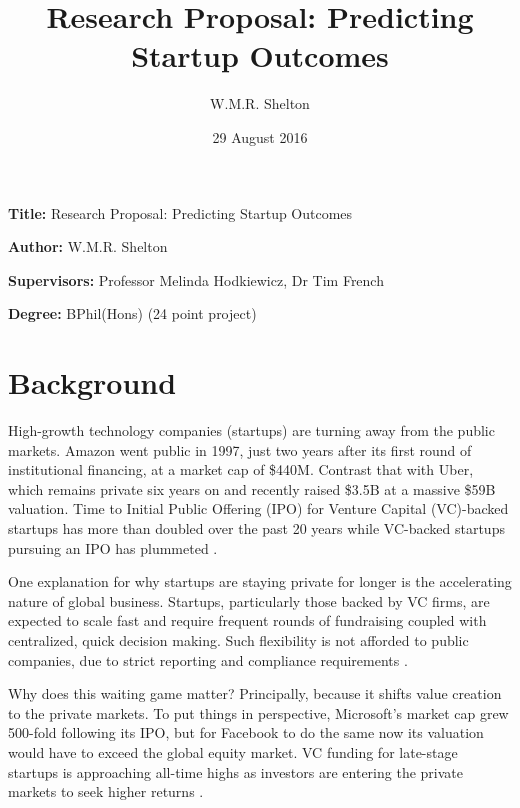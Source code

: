 \documentclass[12pt, a4paper]{article}
\title{Research Proposal: Predicting Startup Outcomes}
\author{W.M.R. Shelton}
\date{29 August 2016}
\newcommand{\namelistlabel}[1]{\mbox{#1}\hfil}
\newenvironment{namelist}[1]{%
\begin{list}{}
    {
        \let\makelabel\namelistlabel
        \settowidth{\labelwidth}{#1}
        \setlength{\leftmargin}{1.1\labelwidth}
    }
  }{%
\end{list}}
\begin{document}
\maketitle

\begin{namelist}{xxxxxxxxxxxx}
\item[{\bf Title:}]
	Research Proposal: Predicting Startup Outcomes
\item[{\bf Author:}]
	W.M.R. Shelton
\item[{\bf Supervisors:}]
	Professor Melinda Hodkiewicz, Dr Tim French
\item[{\bf Degree:}]
	BPhil(Hons) (24 point project)
\end{namelist}

\section*{Background}

High-growth technology companies (startups) are turning away from the public markets. Amazon went public in 1997, just two years after its first round of institutional financing, at a market cap of \$440M. Contrast that with Uber, which remains private six years on and recently raised \$3.5B at a massive \$59B valuation. Time to Initial Public Offering (IPO) for Venture Capital (VC)-backed startups has more than doubled over the past 20 years while VC-backed startups pursuing an IPO has plummeted \cite{nvca2016}.

One explanation for why startups are staying private for longer is the accelerating nature of global business. Startups, particularly those backed by VC firms, are expected to scale fast and require frequent rounds of fundraising coupled with centralized, quick decision making. Such flexibility is not afforded to public companies, due to strict reporting and compliance requirements \cite{wies2015}.

Why does this waiting game matter? Principally, because it shifts value creation to the private markets. To put things in perspective, Microsoft’s market cap grew 500-fold following its IPO, but for Facebook to do the same now its valuation would have to exceed the global equity market. VC funding for late-stage startups is approaching all-time highs as investors are entering the private markets to seek higher returns \cite{nvca2016}.
\end{document}
